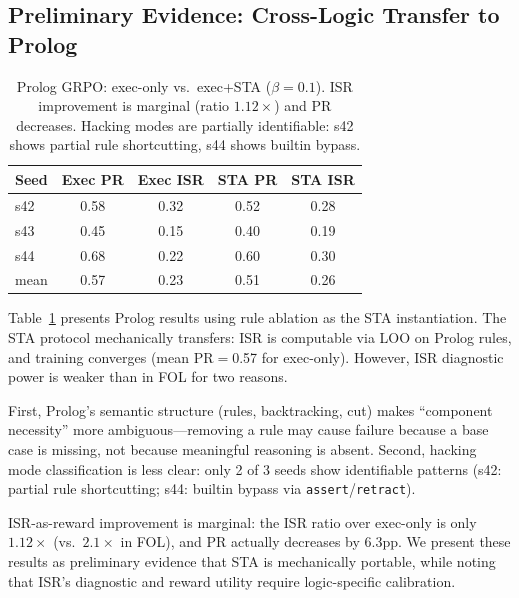 \documentclass[11pt,a4paper]{article}
\begin{document}
\subsection{Preliminary Evidence: Cross-Logic Transfer to Prolog}

\begin{table}[t]
\centering
\small
\begin{tabular}{lcccc}
\toprule
\textbf{Seed} & \textbf{Exec PR} & \textbf{Exec ISR} & \textbf{STA PR} & \textbf{STA ISR} \\
\midrule
s42 & 0.58 & 0.32 & 0.52 & 0.28 \\
s43 & 0.45 & 0.15 & 0.40 & 0.19 \\
s44 & 0.68 & 0.22 & 0.60 & 0.30 \\
\midrule
mean & 0.57 & 0.23 & 0.51 & 0.26 \\
\bottomrule
\end{tabular}
\caption{Prolog GRPO: exec-only vs.\ exec+STA ($\beta{=}0.1$). ISR improvement is marginal (ratio $1.12\times$) and PR decreases. Hacking modes are partially identifiable: s42 shows partial rule shortcutting, s44 shows builtin bypass.}
\label{tab:prolog}
\end{table}

Table~\ref{tab:prolog} presents Prolog results using rule ablation as the STA instantiation.
The STA protocol mechanically transfers: ISR is computable via LOO on Prolog rules, and training converges (mean PR$=$0.57 for exec-only).
However, ISR diagnostic power is weaker than in FOL for two reasons.

First, Prolog's semantic structure (rules, backtracking, cut) makes ``component necessity'' more ambiguous---removing a rule may cause failure because a base case is missing, not because meaningful reasoning is absent.
Second, hacking mode classification is less clear: only 2 of 3 seeds show identifiable patterns (s42: partial rule shortcutting; s44: builtin bypass via \texttt{assert}/\texttt{retract}).

ISR-as-reward improvement is marginal: the ISR ratio over exec-only is only $1.12\times$ (vs.\ $2.1\times$ in FOL), and PR actually decreases by 6.3pp.
We present these results as preliminary evidence that STA is mechanically portable, while noting that ISR's diagnostic and reward utility require logic-specific calibration.
\end{document}
